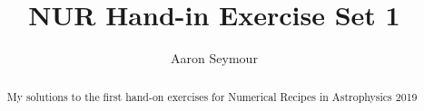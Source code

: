 \documentclass[a4paper,10pt]{article}
\title{NUR Hand-in Exercise Set 1}
\author{Aaron Seymour}
\begin{document}
\maketitle

\begin{abstract}
 My solutions to the first hand-on exercises for Numerical Recipes in Astrophysics 2019
\end{abstract}










\end{document}
